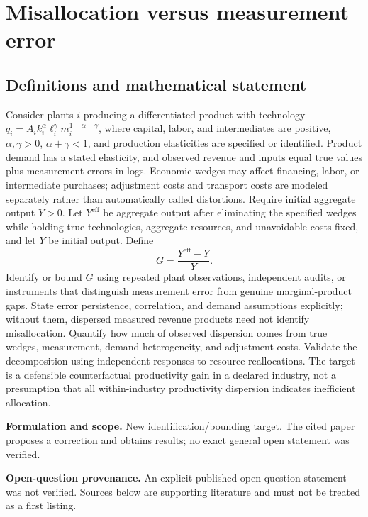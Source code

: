 \documentclass[11pt]{article}
\begin{document}
\section*{Misallocation versus measurement error}\label{30007543}
\subsection{Definitions and mathematical statement}
Consider plants \(i\) producing a differentiated product with technology \(q_i=A_i k_i^\alpha \ell_i^\gamma m_i^{1-\alpha-\gamma}\), where capital, labor, and intermediates are positive, \(\alpha,\gamma>0\), \(\alpha+\gamma<1\), and production elasticities are specified or identified. Product demand has a stated elasticity, and observed revenue and inputs equal true values plus measurement errors in logs. Economic wedges may affect financing, labor, or intermediate purchases; adjustment costs and transport costs are modeled separately rather than automatically called distortions.
Require initial aggregate output \(Y>0\). Let \(Y^{\mathrm{eff}}\) be aggregate output after eliminating the specified wedges while holding true technologies, aggregate resources, and unavoidable costs fixed, and let \(Y\) be initial output. Define
\[
G=\frac{Y^{\mathrm{eff}}-Y}{Y}.
\]
Identify or bound \(G\) using repeated plant observations, independent audits, or instruments that distinguish measurement error from genuine marginal-product gaps. State error persistence, correlation, and demand assumptions explicitly; without them, dispersed measured revenue products need not identify misallocation. Quantify how much of observed dispersion comes from true wedges, measurement, demand heterogeneity, and adjustment costs. Validate the decomposition using independent responses to resource reallocations. The target is a defensible counterfactual productivity gain in a declared industry, not a presumption that all within-industry productivity dispersion indicates inefficient allocation.

\par\textbf{Formulation and scope.} New identification/bounding target. The cited paper proposes a correction and obtains results; no exact general open statement was verified.

\par\textbf{Open-question provenance.} An explicit published open-question statement was not verified. Sources below are supporting literature and must not be treated as a first listing.
\end{document}
